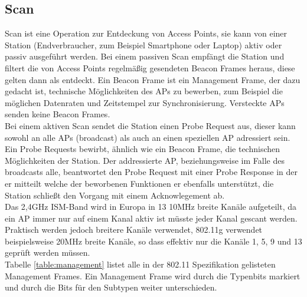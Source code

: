 \subsection{Scan}
\label{ch:phase1:sec:scan}
Scan ist eine Operation zur Entdeckung von Access Points, sie kann von einer Station (Endverbraucher, zum Beispiel Smartphone oder Laptop) aktiv oder passiv ausgeführt werden.
Bei einem passiven Scan empfängt die Station und filtert die von Access Points regelmäßig gesendeten Beacon Frames heraus, diese gelten dann als entdeckt.
Ein Beacon Frame ist ein Management Frame, der dazu gedacht ist, technische Möglichkeiten des APs zu bewerben, zum Beispiel die möglichen Datenraten und Zeitstempel zur Synchronisierung.
Versteckte APs senden keine Beacon Frames. \\
Bei einem aktiven Scan sendet die Station einen Probe Request aus, dieser kann sowohl an alle APs (broadcast) als auch an einen speziellen AP adressiert sein.
Ein Probe Requests bewirbt, ähnlich wie ein Beacon Frame, die technischen Möglichkeiten der Station.
Der addressierte AP, beziehungsweise im Falle des broadcasts alle, beantwortet den Probe Request mit einer Probe Response in der er mitteilt welche der beworbenen Funktionen er ebenfalls unterstützt, die Station schließt den Vorgang mit einem Acknowlegement ab. \\
Das 2,4GHz ISM-Band wird in Europa in 13 10MHz breite Kanäle aufgeteilt, da ein AP immer nur auf einem Kanal aktiv ist müsste jeder Kanal gescant werden.
Praktisch werden jedoch breitere Kanäle verwendet, 802.11g verwendet beispielsweise 20MHz breite Kanäle, so dass effektiv nur die Kanäle 1, 5, 9 und 13 geprüft werden müssen. \\
Tabelle \ref{table:management} listet alle in der 802.11 Spezifikation gelisteten Management Frames.
Ein Management Frame wird durch die Typenbits markiert und durch die Bits für den Subtypen weiter unterschieden.


